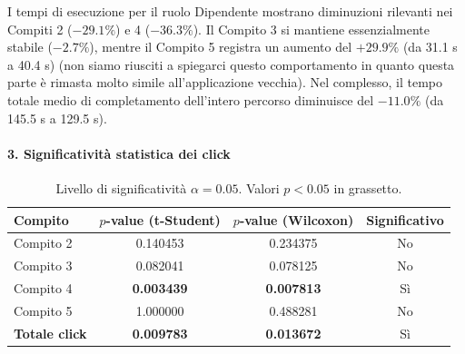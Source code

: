 \vspace{-2mm}
\noindent\small I tempi di esecuzione per il ruolo Dipendente mostrano diminuzioni rilevanti nei Compiti 2 ($-29.1\%$) e 4 ($-36.3\%$). Il Compito 3 si mantiene essenzialmente stabile ($-2.7\%$), mentre il Compito 5 registra un aumento del $+29.9\%$ (da 31.1 s a 40.4 s) (non siamo riusciti a spiegarci questo comportamento in quanto questa parte è rimasta molto simile all'applicazione vecchia). Nel complesso, il tempo totale medio di completamento dell'intero percorso diminuisce del $-11.0\%$ (da 145.5 s a 129.5 s).

\newpage
\paragraph{3. Significatività statistica dei click}\mbox{}\par\vspace{0.5ex}

\begin{table}[h!]
    \centering
    \small
    \begin{tabular}{lccc}
        \toprule
        \textbf{Compito} & \textbf{$p$-value (t-Student)} & \textbf{$p$-value (Wilcoxon)} & \textbf{Significativo} \\
        \midrule
        Compito 2 & 0.140453 & 0.234375 & No \\
        Compito 3 & 0.082041 & 0.078125 & No \\
        Compito 4 & \textbf{0.003439} & \textbf{0.007813} & Sì \\
        Compito 5 & 1.000000 & 0.488281 & No \\
        \midrule
        \textbf{Totale click} & \textbf{0.009783} & \textbf{0.013672} & Sì \\
        \bottomrule
    \end{tabular}
    \caption*{\small Livello di significatività $\alpha = 0.05$. Valori $p < 0.05$ in grassetto.}
\end{table}

